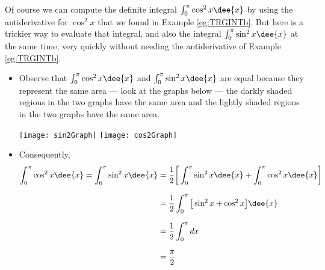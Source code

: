 \begin{eg}
                                                      \label{eg:TRGINTd}
Of course we can compute the definite integral $\int_0^\pi \cos^2 x\dee{x}$
by using the antiderivative for $\cos^2 x$ that we found in
Example \ref{eg:TRGINTb}. But here is a trickier way to evaluate that integral,
and also the integral $\int_0^\pi \sin^2 x\dee{x}$ at the same time,
very quickly without needing the antiderivative of  Example \ref{eg:TRGINTb}.

\soln
\begin{itemize}
 \item Observe that $\int_0^\pi \cos^2 x\dee{x}$ and
$\int_0^\pi \sin^2 x\dee{x}$ are equal because they represent the same
area --- look at the graphs below --- the darkly shaded regions in the
two graphs have the same area and the lightly shaded regions in the two
graphs have the same area.
\begin{efig}
\begin{center}
  \texttt{[image: sin2Graph]}\qquad
  \texttt{[image: cos2Graph]}
\end{center}
\end{efig}
\item Consequently,
\begin{align*}
\int_0^\pi \cos^2 x\dee{x}
= \int_0^\pi \sin^2 x\dee{x}
 &= \frac{1}{2}\bigg[\int_0^\pi \sin^2 x\dee{x}
                         +\int_0^\pi \cos^2 x\dee{x}\bigg] \\[0.1in]
&=\frac{1}{2}\int_0^\pi \big[\sin^2 x+ \cos^2 x\big]\dee{x}\\[0.1in]
&= \frac{1}{2}\int_0^\pi dx \\[0.1in]
&=\frac{\pi}{2}
\end{align*}
\end{itemize}
\end{eg}

